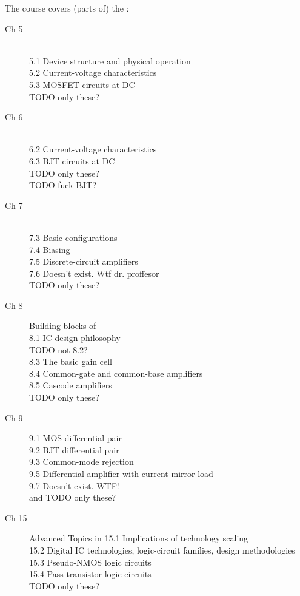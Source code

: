 The course covers (parts of) the :

\begin{description}
  \item [Ch 5]  \\
               5.1 Device structure and physical operation \\
               5.2 Current-voltage characteristics \\
               5.3 MOSFET circuits at DC \\
               TODO only these?
  \item [Ch 6]  \\
               6.2 Current-voltage characteristics \\
               6.3 BJT circuits at DC \\
               TODO only these? \\
               TODO fuck BJT?
  \item [Ch 7]  \\
               7.3 Basic configurations \\
               7.4 Biasing \\
               7.5 Discrete-circuit amplifiers \\
               7.6 Doesn't exist. Wtf dr. proffesor \\
               TODO only these?
  \item [Ch 8] Building blocks of  \\
               8.1 IC design philosophy \\
               TODO not 8.2? \\
               8.3 The basic gain cell \\
               8.4 Common-gate and common-base amplifiers \\
               8.5 Cascode amplifiers \\
               TODO only these?
  \item [Ch 9] 
               9.1 MOS differential pair \\
               9.2 BJT differential pair \\
               9.3 Common-mode rejection \\
               9.5 Differential amplifier with current-mirror load \\
               9.7 Doesn't exist. WTF! \\
               and 
               TODO only these?
  \item [Ch 15] Advanced Topics in 
               15.1 Implications of technology scaling \\
               15.2 Digital IC technologies, logic-circuit families,
                    design methodologies \\
               15.3 Pseudo-NMOS logic circuits \\
               15.4 Pass-transistor logic circuits \\
               TODO only these?
\end{description}

